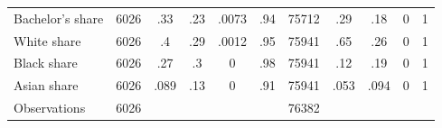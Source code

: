 {\begin{tabular}{l*{2}{ccccc}}
Bachelor's share    &        6026&         .33&         .23&       .0073&         .94&       75712&         .29&         .18&           0&           1\\
White share         &        6026&          .4&         .29&       .0012&         .95&       75941&         .65&         .26&           0&           1\\
Black share         &        6026&         .27&          .3&           0&         .98&       75941&         .12&         .19&           0&           1\\
Asian share         &        6026&        .089&         .13&           0&         .91&       75941&        .053&        .094&           0&           1\\
\midrule
Observations        &        6026&            &            &            &            &       76382&            &            &            &            \\
\bottomrule
\end{tabular}
}
